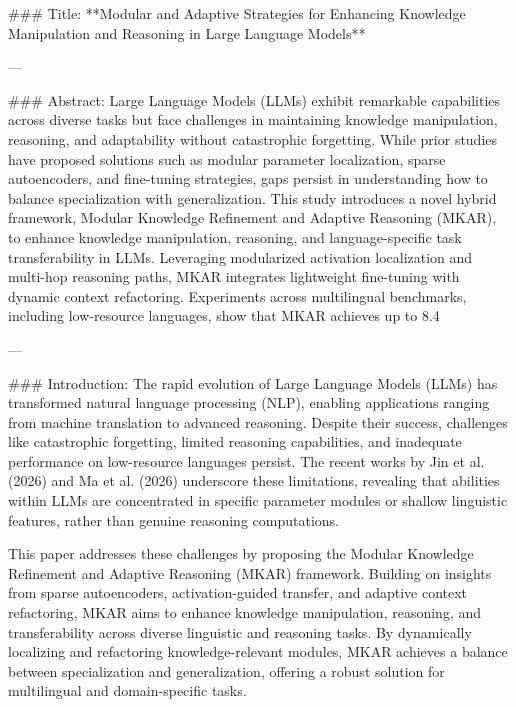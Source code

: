### Title:
**Modular and Adaptive Strategies for Enhancing Knowledge Manipulation and Reasoning in Large Language Models**

---

### Abstract:
Large Language Models (LLMs) exhibit remarkable capabilities across diverse tasks but face challenges in maintaining knowledge manipulation, reasoning, and adaptability without catastrophic forgetting. While prior studies have proposed solutions such as modular parameter localization, sparse autoencoders, and fine-tuning strategies, gaps persist in understanding how to balance specialization with generalization. This study introduces a novel hybrid framework, Modular Knowledge Refinement and Adaptive Reasoning (MKAR), to enhance knowledge manipulation, reasoning, and language-specific task transferability in LLMs. Leveraging modularized activation localization and multi-hop reasoning paths, MKAR integrates lightweight fine-tuning with dynamic context refactoring. Experiments across multilingual benchmarks, including low-resource languages, show that MKAR achieves up to 8.4%

---

### Introduction:
The rapid evolution of Large Language Models (LLMs) has transformed natural language processing (NLP), enabling applications ranging from machine translation to advanced reasoning. Despite their success, challenges like catastrophic forgetting, limited reasoning capabilities, and inadequate performance on low-resource languages persist. The recent works by Jin et al. (2026) and Ma et al. (2026) underscore these limitations, revealing that abilities within LLMs are concentrated in specific parameter modules or shallow linguistic features, rather than genuine reasoning computations.

This paper addresses these challenges by proposing the Modular Knowledge Refinement and Adaptive Reasoning (MKAR) framework. Building on insights from sparse autoencoders, activation-guided transfer, and adaptive context refactoring, MKAR aims to enhance knowledge manipulation, reasoning, and transferability across diverse linguistic and reasoning tasks. By dynamically localizing and refactoring knowledge-relevant modules, MKAR achieves a balance between specialization and generalization, offering a robust solution for multilingual and domain-specific tasks.


